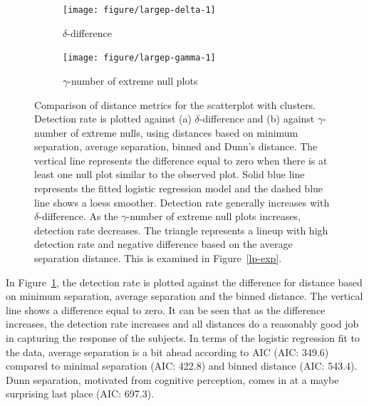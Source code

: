 \documentclass[12pt]{article}\usepackage[]{graphicx}\usepackage[]{color}
\newenvironment{knitrout}{}{} %
\begin{document}
\begin{figure}[!t]
\centering
\begin{subfigure}[t]{\textwidth}
\caption{$\delta$-difference}
\centering
\begin{knitrout}
\color{fgcolor}
\texttt{[image: figure/largep-delta-1]} 

\end{knitrout}
\end{subfigure}
\begin{subfigure}[t]{\textwidth}
\caption{$\gamma$-number of extreme null plots}
\centering
\begin{knitrout}
\color{fgcolor}
\texttt{[image: figure/largep-gamma-1]} 

\end{knitrout}
\end{subfigure}

	\vspace{-.1in}
\caption{Comparison of distance metrics for the scatterplot with clusters. Detection rate is plotted against (a) $\delta$-difference and (b) against $\gamma$-number of extreme nulls, using distances based on minimum separation, average separation, binned and Dunn's distance. The vertical line represents the difference equal to zero when there is at least one null plot similar to the observed plot. Solid blue line represents the fitted logistic regression model and the dashed blue line shows a loess smoother.  Detection rate generally increases with $\delta$-difference. As the $\gamma$-number of extreme null plots increases, detection rate decreases. The triangle represents a lineup with high detection rate and negative difference based on the average separation distance. This is examined in Figure~\ref{lp-exp}. }
\label{lp-comp}
\end{figure}

In Figure~\ref{lp-comp}, the detection rate is plotted against the difference for distance based on minimum separation, average separation and the binned distance. The  vertical line shows a difference equal to zero.  It can be seen that as the difference increases, the detection rate increases and all distances do a reasonably good job in capturing the response of the subjects. In terms of the logistic regression fit to the data, average separation is a bit ahead according to AIC (AIC: 349.6) 
compared to minimal separation  (AIC: 422.8) 
and binned distance (AIC: 543.4). Dunn separation, motivated from cognitive perception, comes in at a maybe surprising last place (AIC: 697.3).
\end{document}

